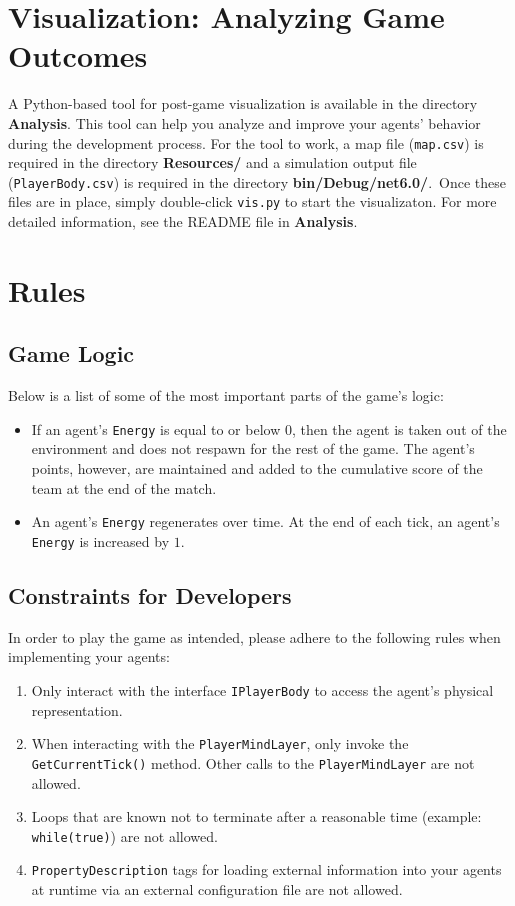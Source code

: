 \documentclass[
  a4paper,
  english,
  DIV=16,
  11pt,
  parskip=half,
  dvipsnames,
  listof=totoc,		     %
  index=totoc,		     %
  bibliography=totoc,	 %
]{scrartcl}
\begin{document}
\section{Visualization: Analyzing Game Outcomes} \label{sec:vis}
%
A Python-based tool for post-game visualization is available in the directory \textbf{Analysis}. This tool can help you analyze and improve your agents' behavior during the development process. For the tool to work, a map file (\texttt{map.csv}) is required in the directory \textbf{Resources/} and a simulation output file (\texttt{PlayerBody.csv}) is required in the directory \textbf{bin/Debug/net6.0/}.~Once these files are in place, simply double-click \texttt{vis.py} to start the visualizaton. For more detailed information, see the README file in \textbf{Analysis}.
%
%
\section{Rules} \label{sec:rules}
%
\subsection{Game Logic}
Below is a list of some of the most important parts of the game's logic:
%
\begin{itemize}
  \item If an agent's \texttt{Energy} is equal to or below 0, then the agent is taken out of the environment and does not respawn for the rest of the game. The agent's points, however, are maintained and added to the cumulative score of the team at the end of the match.
  \item An agent's \texttt{Energy} regenerates over time. At the end of each tick, an agent's \texttt{Energy} is increased by $1$.
\end{itemize}
%
\subsection{Constraints for Developers}
In order to play the game as intended, please adhere to the following rules when implementing your agents:
\begin{enumerate}
  \item Only interact with the interface \texttt{IPlayerBody} to access the agent's physical representation.
  \item When interacting with the \texttt{PlayerMindLayer}, only invoke the \texttt{GetCurrentTick()} method. Other calls to the \texttt{PlayerMindLayer} are not allowed.
  \item Loops that are known not to terminate after a reasonable time (example: \texttt{while(true)}) are not allowed.
  \item \texttt{PropertyDescription} tags for loading external information into your agents at runtime via an external configuration file are not allowed.
\end{enumerate}
%
\end{document}
